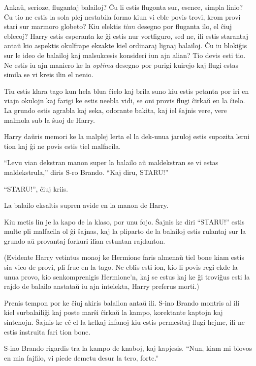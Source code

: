 Ankaŭ, serioze, flugantaj balailoj? Ĉu li estis flugonta sur, esence,
simpla linio? Ĉu tio ne estis la sola plej nestabila formo kiun vi
eble povis trovi, krom provi stari sur marmoro globeto?  Kiu elektis
\emph{tiun} desegno por fluganta ilo, el ĉiuj eblecoj? Harry estis
esperanta ke ĝi estis nur vortfiguro, sed ne, ili estis starantaj
antaŭ kio aspektis okulfrape ekzakte kiel ordinaraj lignaj
balailoj. Ĉu iu blokiĝis sur le ideo de balailoj kaj malsukcesis
konsideri iun ajn alian? Tio devis esti tio. Ne estis iu ajn maniero
ke la \emph{optima} desegno por purigi kuirejo kaj flugi estas simila
se vi kreis ilin el nenio.

Tiu estis klara tago kun hela blua ĉielo kaj brila suno kiu estis
petanta por iri en viajn okulojn kaj farigi ke estis neebla vidi, se
oni provis flugi ĉirkaŭ en la ĉielo. La grundo estis agrabla kaj seka,
odorante bakita, kaj iel ŝajnis vere, vere malmola sub la ŝuoj de
Harry.

Harry daŭris memori ke la malplej lerta el la dek-unua jaruloj estis
supozita lerni tion kaj ĝi ne povis estis tiel malfacila.


``Levu vian dekstran manon super la balailo aŭ maldekstran se vi estas
maldekstrula,'' diris S-ro Brando. ``Kaj diru, STARU!''

``STARU!'', ĉiuj kriis.

La balailo eksaltis supren avide en la manon de Harry.

Kiu metis lin je la kapo de la klaso, por unu fojo. Ŝajnis ke diri
``STARU!'' estis multe pli malfacila ol ĝi ŝajnas, kaj la pliparto de
la balailoj estis rulantaj sur la grundo aŭ provantaj forkuri ilian
estuntan rajdanton.

(Evidente Harry vetintus monoj ke Hermione faris almenaŭ tiel bone
kiam estis sia vico de provi, pli frue en la tago. Ne eblis esti ion,
kio li povis regi ekde la unua provo, kio senkomprenigis Hermione'n,
kaj se estus kaj ke ĝi troviĝus esti la rajdo de balailo anstataŭ iu
ajn intelekta, Harry preferus morti.)

Prenis tempon por ke ĉiuj akiris balailon antaŭ ili. S-ino Brando
montris al ili kiel surbalailiĝi kaj poste marŝi ĉirkaŭ la kampo,
korektante kaptojn kaj sintenojn. Ŝajnis ke eĉ el la kelkaj infanoj
kiu estis permesitaj flugi hejme, ili ne estis instruita fari tion
bone.

S-ino Brando rigardis tra la kampo de knaboj, kaj kapjesis. ``Nun,
kiam mi blovos en mia fajfilo, vi piede demetu desur la tero, forte.''

